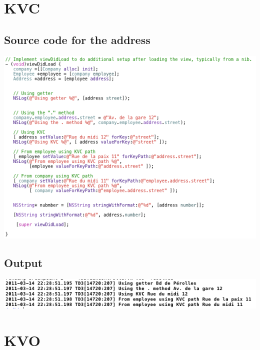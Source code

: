 \documentclass[a4paper,10pt]{article}
\begin{document}
	
	
	
	
	\section{KVC  }
		\subsection{Source code for the address}
		\begin{center}
					 \includegraphics[width=1\textwidth]{./images/srcKVC.png}
		\end{center}
		\subsection{Output }
				\begin{center}
							 \includegraphics[width=1\textwidth]{./images/resultKVC.png}
				\end{center}
		\section{ KVO }
\end{document}
